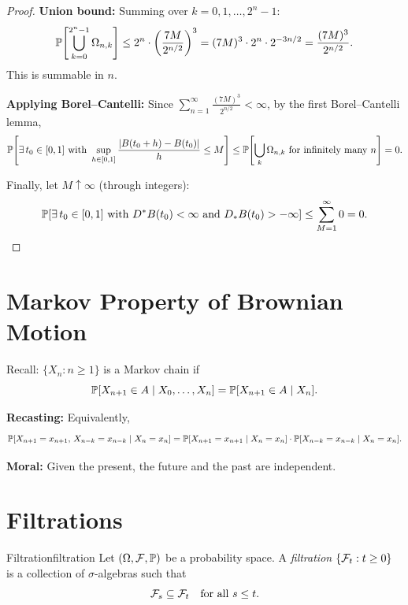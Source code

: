 \begin{proof}
    \textbf{Union bound:} Summing over $k = 0, 1, \ldots, 2^n - 1$:
    \[
        \mathbb{P}\!\left[\bigcup_{k=0}^{2^n - 1} \Omega_{n,k}\right]
        \leq 2^n \cdot \left(\frac{7M}{2^{n/2}}\right)^3
        = (7M)^3 \cdot 2^n \cdot 2^{-3n/2}
        = \frac{(7M)^3}{2^{n/2}}.
    \]
    This is summable in $n$.

    \medskip
    \textbf{Applying Borel--Cantelli:} Since $\sum_{n=1}^{\infty} \frac{(7M)^3}{2^{n/2}} < \infty$, by the first Borel--Cantelli lemma,
    \[
        \mathbb{P}\!\left[\exists\, t_0 \in [0,1] \text{ with } \sup_{h \in [0,1]} \frac{\left|B(t_0+h) - B(t_0)\right|}{h} \leq M\right]
        \leq \mathbb{P}\!\left[\bigcup_{k} \Omega_{n,k} \text{ for infinitely many } n\right] = 0.
    \]

    Finally, let $M \uparrow \infty$ (through integers):
    \[
        \mathbb{P}\!\left[\exists\, t_0 \in [0,1] \text{ with } D^* B(t_0) < \infty \text{ and } D_* B(t_0) > -\infty\right]
        \leq \sum_{M=1}^{\infty} 0 = 0. \qedhere
    \]
\end{proof}

\section{Markov Property of Brownian Motion}

Recall: $\{X_n : n \geq 1\}$ is a Markov chain if
\[
    \mathbb{P}[X_{n+1} \in A \mid X_0, \ldots, X_n] = \mathbb{P}[X_{n+1} \in A \mid X_n].
\]

\textbf{Recasting:} Equivalently,
\[
    \mathbb{P}[X_{n+1} = x_{n+1},\, X_{n-k} = x_{n-k} \mid X_n = x_n]
    = \mathbb{P}[X_{n+1} = x_{n+1} \mid X_n = x_n] \cdot \mathbb{P}[X_{n-k} = x_{n-k} \mid X_n = x_n].
\]

\textbf{Moral:} Given the present, the future and the past are independent.

\section{Filtrations}

\begin{definition}{Filtration}{filtration}
    Let $(\Omega, \mathcal{F}, \mathbb{P})$ be a probability space. A \emph{filtration} $\{\mathcal{F}_t : t \geq 0\}$ is a collection of $\sigma$-algebras such that
    \[
        \mathcal{F}_s \subseteq \mathcal{F}_t \quad \text{for all } s \leq t.
    \]
\end{definition}

